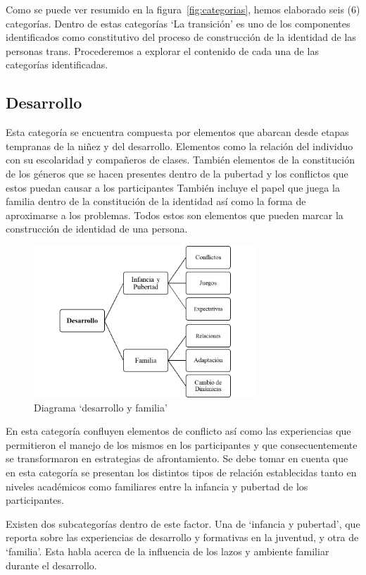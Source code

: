 Como se puede ver resumido en la figura~\ref{fig:categorias}, hemos elaborado
seis (6) categorías. Dentro de estas categorías ‘La transición’ es uno de los
componentes identificados como constitutivo del proceso de construcción de la
identidad de las personas trans. Procederemos a explorar el contenido de cada
una de las categorías identificadas.

\subsection{Desarrollo}
Esta categoría se encuentra compuesta por elementos que abarcan desde etapas
tempranas de la niñez y del desarrollo.
Elementos como la relación del individuo con su escolaridad y compañeros de
clases.
También elementos de la constitución de los géneros que se hacen presentes
dentro de la pubertad y los conflictos que estos puedan causar a los
participantes
También incluye el papel que juega la familia dentro de la constitución de la
identidad así como la forma de aproximarse a los problemas.
Todos estos son elementos que pueden marcar la construcción de identidad de una
persona.

\begin{figure}
    \centering
    \includegraphics[width=0.75\textwidth]{desarrollo}
    \caption{Diagrama ‘desarrollo y familia’}\label{fig:desarrollo}
\end{figure}

En esta categoría confluyen elementos de conflicto así como las experiencias que
permitieron el manejo de los mismos en los participantes y que
consecuentemente se transformaron en estrategias de afrontamiento. Se debe tomar
en cuenta que en esta categoría se presentan los distintos tipos de relación
establecidas tanto en niveles académicos como familiares entre la infancia y
pubertad de los participantes.

Existen dos subcategorías dentro de este factor. Una de ‘infancia y pubertad’,
que reporta sobre las experiencias de desarrollo y formativas en la juventud, y
otra de ‘familia’. Esta habla acerca de la influencia de los lazos y ambiente
familiar durante el desarrollo.

